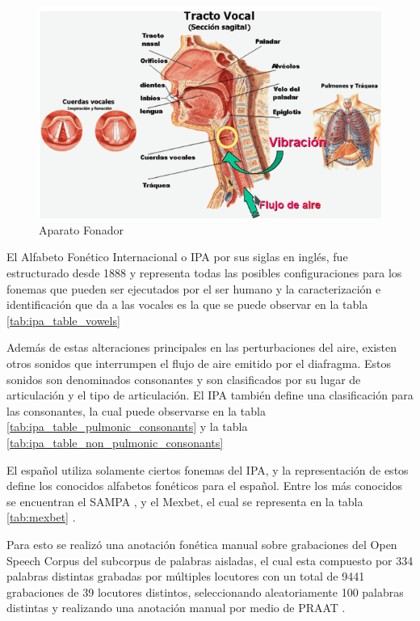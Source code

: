 \begin{figure}[H]
\caption{Aparato Fonador\cite{hableomsDeVoz}}
\label{img:aparato_fonador}
\includegraphics[width=\textwidth]{imagenes/03_02_aparato_fonador.png}
\end{figure}

El Alfabeto Fonético Internacional o IPA por sus siglas en inglés, fue estructurado desde 1888 y representa todas las posibles configuraciones para los fonemas que pueden ser ejecutados por el ser humano y la caracterización e identificación que da a las vocales es la que se puede observar en la tabla \ref{tab:ipa_table_vowels}




Además de estas alteraciones principales en las perturbaciones del aire, existen otros sonidos que interrumpen el flujo de aire emitido por el diafragma. Estos sonidos son denominados consonantes y son clasificados por su lugar de articulación y el tipo de articulación. El IPA también define una clasificación para las consonantes, la cual puede observarse en la tabla \ref{tab:ipa_table_pulmonic_consonants} y la tabla \ref{tab:ipa_table_non_pulmonic_consonants}





El español utiliza solamente ciertos fonemas del IPA, y la representación de estos define los conocidos alfabetos fonéticos para el español. Entre los más conocidos se encuentran el SAMPA \cite{SAMPA}, y el Mexbet, el cual se representa en la tabla \ref{tab:mexbet} \cite{mexbet}.



Para esto se realizó una anotación fonética manual sobre grabaciones del Open Speech Corpus \cite{Collazos2015} del subcorpus de palabras aisladas, el cual esta compuesto por 334 palabras distintas grabadas por múltiples locutores con un total de 9441 grabaciones de 39 locutores distintos, seleccionando aleatoriamente 100 palabras distintas y realizando una anotación manual por medio de PRAAT \cite{Praat}.

